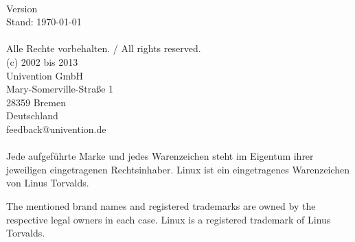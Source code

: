 
\begin{titlepage}
  \thispagestyle{empty}


  \vspace*{3cm}
  \sffamily \bfseries
  \begin{center}
    \Huge
      \ucsManualTitle \\ [3.5cm]
    \huge
  \end{center}
  \normalsize
  \normalfont

\newpage
\AddToShipoutPicture{\ifthenelse{\isodd{\thepage}}%
	{\BackgroundPicOdd}{\BackgroundPicEven}}
\thispagestyle{empty}
\parindent0cm
\sffamily
\vspace*{11cm}

Version \ucsManualVersion \\
Stand: \today \\
\\
Alle Rechte vorbehalten. / All rights reserved.\\
(c) 2002 bis 2013 \\
Univention GmbH \\
Mary-Somerville-Straße 1 \\
28359 Bremen \\
Deutschland \\
feedback@univention.de \\
\\
Jede aufgeführte Marke und jedes Warenzeichen steht im Eigentum ihrer
jeweiligen eingetragenen Rechtsinhaber. Linux ist ein eingetragenes
Warenzeichen von Linus Torvalds.

The mentioned brand names and registered trademarks are owned by the
respective legal owners in each case. Linux is a registered trademark
of Linus Torvalds.

\end{titlepage}


\dominitoc
\tableofcontents
\newpage

